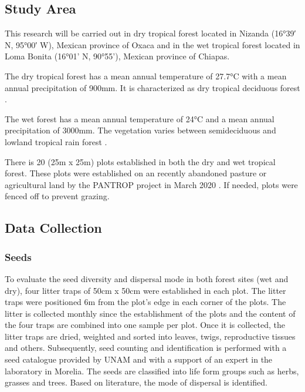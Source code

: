 

\subsection{Study Area}
This research will be carried out in dry tropical forest located in Nizanda (16°39′ N, 95°00′ W), Mexican province of Oxaca and in the wet tropical forest located in Loma Bonita (16°01’ N, 90°55’), Mexican province of Chiapas. 

The dry tropical forest has a mean annual temperature of 27.7°C with a mean annual precipitation of 900mm. It is characterized as dry tropical deciduous forest \citep{hordijkLandUseHistory2024}. 

The wet forest has a mean annual temperature of 24°C and a mean annual precipitation of 3000mm. The vegetation varies between semideciduous and lowland tropical rain forest \citep{hordijkLandUseHistory2024}.

There is 20 (25m x 25m) plots established in both the dry and wet tropical forest. These plots were established on an recently abandoned pasture or agricultural land by the PANTROP project in March 2020 \citep{hordijkLandUseHistory2024}. If needed, plots were fenced off to prevent grazing. 



\subsection{Data Collection}

\subsubsection{Seeds}
To evaluate the seed diversity and dispersal mode in both forest sites (wet and dry), four litter traps of 50cm x 50cm were established in each plot. The litter traps were positioned 6m from the plot's edge in each corner of the plots. The litter is collected monthly since the establishment of the plots and the content of the four traps are combined into one sample per plot. 
Once it is collected, the litter traps are dried, weighted and sorted into leaves, twigs, reproductive tissues and others. Subsequently, seed counting and identification is performed with a seed catalogue provided by UNAM and with a support of an expert in the laboratory in Morelia. The seeds are classified into life form groups such as herbs, grasses and trees. Based on literature, the mode of dispersal is identified. 

